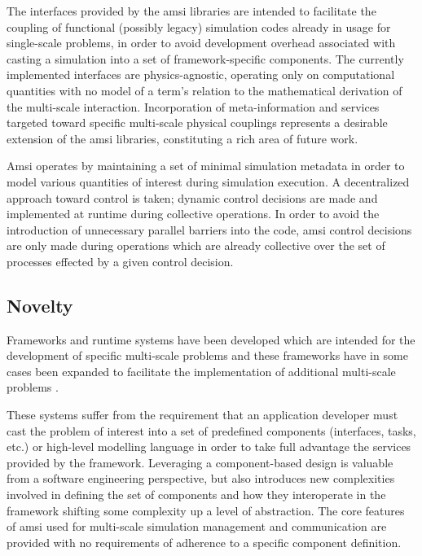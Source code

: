 \documentclass[11pt]{siamltex1213}
\begin{document}
The interfaces provided by the amsi libraries are intended to facilitate the coupling of functional (possibly legacy) simulation codes already in usage for single-scale problems, in order to avoid development overhead associated with casting a simulation into a set of framework-specific components. The currently implemented interfaces are physics-agnostic, operating only on computational quantities with no model of a term's relation to the mathematical derivation of the multi-scale interaction. Incorporation of meta-information and services targeted toward specific multi-scale physical couplings represents a desirable extension of the amsi libraries, constituting a rich area of future work.

Amsi operates by maintaining a set of minimal simulation metadata in order to model various quantities of interest during simulation execution. A decentralized approach toward control is taken; dynamic control decisions are made and implemented at runtime during collective operations. In order to avoid the introduction of unnecessary parallel barriers into the code, amsi control decisions are only made during operations which are already collective over the set of processes effected by a given control decision.

\subsection{Novelty} %
Frameworks and runtime systems have been developed which are intended for the development of specific multi-scale problems \cite{parker2006component} \cite{chopard2011framework} \cite{} and these frameworks have in some cases been expanded to facilitate the implementation of additional multi-scale problems \cite{berzins2010uintah}.

These systems suffer from the requirement that an application developer must cast the problem of interest into a set of predefined components (interfaces, tasks, etc.) or high-level modelling language in order to take full advantage the services provided by the framework. Leveraging a component-based design is valuable from a software engineering perspective, but also introduces new complexities involved in defining the set of components and how they interoperate in the framework shifting some complexity up a level of abstraction. The core features of amsi used for multi-scale simulation management and communication are provided with no requirements of adherence to a specific component definition.
\end{document}
